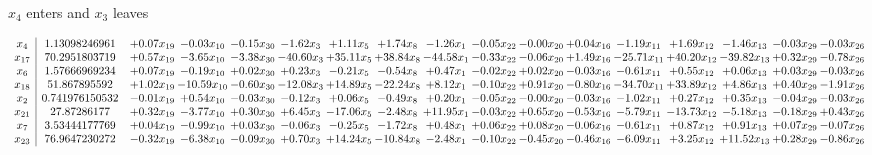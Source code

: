 \documentclass[9pt]{article}
\begin{document}
 $ x_{4} $ enters and $ x_{3} $ leaves 

 \[\begin{array}{c| c c@{\hskip 2pt} c@{\hskip 2pt} c@{\hskip 2pt} c@{\hskip 2pt} c@{\hskip 2pt} c@{\hskip 2pt} c@{\hskip 2pt} c@{\hskip 2pt} c@{\hskip 2pt} c@{\hskip 2pt} c@{\hskip 2pt} c@{\hskip 2pt} c@{\hskip 2pt} c@{\hskip 2pt} c@{\hskip 2pt} }
 x_{4}   &  1.13098246961 & +  0.07 x_{19} & -0.03 x_{10} & -0.15 x_{30} & -1.62 x_{3} & +  1.11 x_{5} & +  1.74 x_{8} & -1.26 x_{1} & -0.05 x_{22} & -0.00 x_{20} & +  0.04 x_{16} & -1.19 x_{11} & +  1.69 x_{12} & -1.46 x_{13} & -0.03 x_{29} & -0.03 x_{26}\\
 x_{17}   &  70.2951803719 & +  0.57 x_{19} & -3.65 x_{10} & -3.38 x_{30} & -40.60 x_{3} & + 35.11 x_{5} & + 38.84 x_{8} & -44.58 x_{1} & -0.33 x_{22} & -0.06 x_{20} & +  1.49 x_{16} & -25.71 x_{11} & + 40.20 x_{12} & -39.82 x_{13} & +  0.32 x_{29} & -0.78 x_{26}\\
 x_{6}   &  1.57666969234 & +  0.07 x_{19} & -0.19 x_{10} & +  0.02 x_{30} & +  0.23 x_{3} & -0.21 x_{5} & -0.54 x_{8} & +  0.47 x_{1} & -0.02 x_{22} & +  0.02 x_{20} & -0.03 x_{16} & -0.61 x_{11} & +  0.55 x_{12} & +  0.06 x_{13} & +  0.03 x_{29} & -0.03 x_{26}\\
 x_{18}   &  51.867895592 & +  1.02 x_{19} & -10.59 x_{10} & -0.60 x_{30} & -12.08 x_{3} & + 14.89 x_{5} & -22.24 x_{8} & +  8.12 x_{1} & -0.10 x_{22} & +  0.91 x_{20} & -0.80 x_{16} & -34.70 x_{11} & + 33.89 x_{12} & +  4.86 x_{13} & +  0.40 x_{29} & -1.91 x_{26}\\
 x_{2}   &  0.741976150532 & -0.01 x_{19} & +  0.54 x_{10} & -0.03 x_{30} & -0.12 x_{3} & +  0.06 x_{5} & -0.49 x_{8} & +  0.20 x_{1} & -0.05 x_{22} & -0.00 x_{20} & -0.03 x_{16} & -1.02 x_{11} & +  0.27 x_{12} & +  0.35 x_{13} & -0.04 x_{29} & -0.03 x_{26}\\
 x_{21}   &  27.87286177 & +  0.32 x_{19} & -3.77 x_{10} & +  0.30 x_{30} & +  6.45 x_{3} & -17.06 x_{5} & -2.48 x_{8} & + 11.95 x_{1} & -0.03 x_{22} & +  0.65 x_{20} & -0.53 x_{16} & -5.79 x_{11} & -13.73 x_{12} & -5.18 x_{13} & -0.18 x_{29} & +  0.43 x_{26}\\
 x_{7}   &  3.53444177769 & +  0.04 x_{19} & -0.99 x_{10} & +  0.03 x_{30} & -0.06 x_{3} & -0.25 x_{5} & -1.72 x_{8} & +  0.48 x_{1} & +  0.06 x_{22} & +  0.08 x_{20} & -0.06 x_{16} & -0.61 x_{11} & +  0.87 x_{12} & +  0.91 x_{13} & +  0.07 x_{29} & -0.07 x_{26}\\
 x_{23}   &  76.9647230272 & -0.32 x_{19} & -6.38 x_{10} & -0.09 x_{30} & +  0.70 x_{3} & + 14.24 x_{5} & -10.84 x_{8} & -2.48 x_{1} & -0.10 x_{22} & -0.45 x_{20} & -0.46 x_{16} & -6.09 x_{11} & +  3.25 x_{12} & + 11.52 x_{13} & +  0.28 x_{29} & -0.86 x_{26}\\

\end{array}\]
\end{document}
